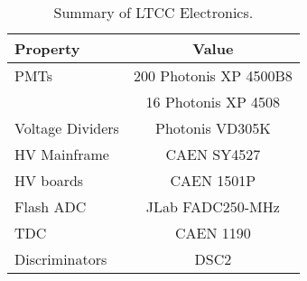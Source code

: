 \begin{table}[h]
	\begin{center}
		\begin{tabular}{| l | c |}
			\hline \hline
			Property                 & Value \\
			\hline
			PMTs             & 200 Photonis XP 4500B8    \\
	                         & 16 Photonis XP 4508       \\
			Voltage Dividers & Photonis VD305K           \\
			HV Mainframe     & CAEN SY4527               \\
			HV boards        & CAEN 1501P                     \\
			Flash ADC        & JLab FADC250-MHz\cite{daq-nim} \\
			TDC              & CAEN 1190                 \\
			Discriminators   & DSC2\cite{daq-nim}        \\
			\hline \hline
		\end{tabular}
	\end{center}
	\caption{Summary of LTCC Electronics.}\label{tab:ltccChannels}
\end{table}

